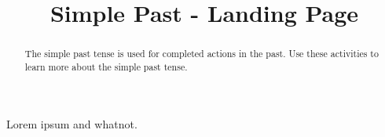 \documentclass{ximera}
\title{Simple Past - Landing Page}
\begin{document}
\begin{abstract}
The simple past tense is used for completed actions in the past.  Use these activities to learn more about the simple past tense.
\end{abstract}
\maketitle

Lorem ipsum and whatnot.
\end{document}
